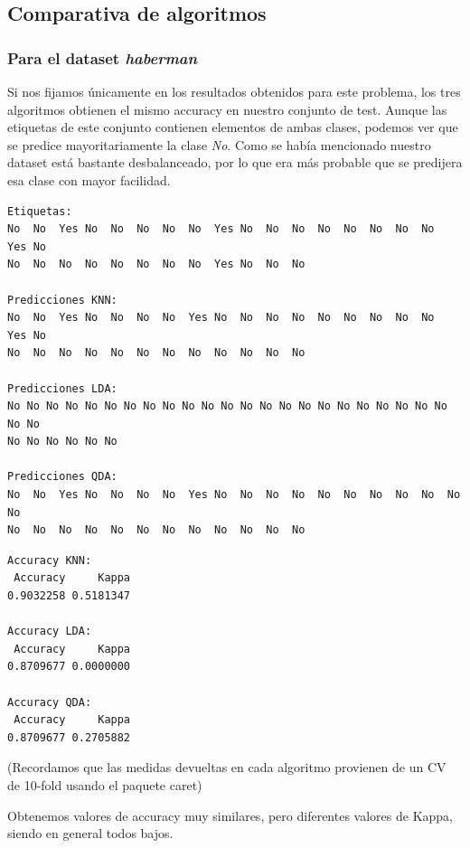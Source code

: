 \subsection{Comparativa de algoritmos}
\subsubsection{Para el dataset \textit{haberman}}

Si nos fijamos únicamente en los resultados obtenidos para este problema, los tres algoritmos obtienen el mismo accuracy en nuestro conjunto de test. Aunque las etiquetas de este conjunto contienen elementos de ambas clases, podemos ver que se predice mayoritariamente la clase \textit{No}. Como se había mencionado nuestro dataset está bastante desbalanceado, por lo que era más probable que se predijera esa clase con mayor facilidad.

\begin{verbatim}
Etiquetas:
No  No  Yes No  No  No  No  No  Yes No  No  No  No  No  No  No  No  Yes No 
No  No  No  No  No  No  No  No  Yes No  No  No 

Predicciones KNN:
No  No  Yes No  No  No  No  Yes No  No  No  No  No  No  No  No  No  Yes No 
No  No  No  No  No  No  No  No  No  No  No  No 

Predicciones LDA:
No No No No No No No No No No No No No No No No No No No No No No No No No
No No No No No No

Predicciones QDA:
No  No  Yes No  No  No  No  Yes No  No  No  No  No  No  No  No  No  No  No 
No  No  No  No  No  No  No  No  No  No  No  No 
\end{verbatim}

\vspace{\baselineskip}

\begin{verbatim}
Accuracy KNN:
 Accuracy     Kappa 
0.9032258 0.5181347 

Accuracy LDA:
 Accuracy     Kappa 
0.8709677 0.0000000 

Accuracy QDA:
 Accuracy     Kappa 
0.8709677 0.2705882 
\end{verbatim}
(Recordamos que las medidas devueltas en cada algoritmo provienen de un CV de 10-fold usando el paquete caret)

Obtenemos valores de accuracy muy similares, pero diferentes valores de Kappa, siendo en general todos bajos.

\vspace{\baselineskip}

